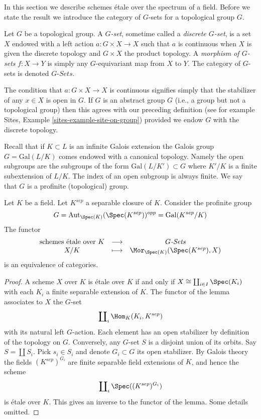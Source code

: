 \noindent
In this section we describe schemes \'etale over the spectrum of
a field. Before we state the result we introduce
the category of $G$-sets for a topological group $G$.

\begin{definition}
\label{definition-G-set-continuous}
Let $G$ be a topological group.
A {\it $G$-set}, sometime called a {\it discrete $G$-set},
is a set $X$ endowed with a left action $a : G \times X \to X$
such that $a$ is continuous when $X$ is given the discrete topology and
$G \times X$ the product topology.
A {\it morphism of $G$-sets} $f : X \to Y$ is simply any $G$-equivariant
map from $X$ to $Y$.
The category of $G$-sets is denoted {\it $G\textit{-Sets}$}.
\end{definition}

\noindent
The condition that $a : G \times X \to X$ is continuous signifies
simply that the stabilizer of any  $x \in X$ is open in $G$.
If $G$ is an abstract group $G$ (i.e., a group but not a topological group)
then this agrees with our preceding definition (see for example
Sites, Example \ref{sites-example-site-on-group})
provided we endow $G$ with the discrete topology.

\medskip\noindent
Recall that if $K \subset L$ is an infinite Galois extension the
Galois group $G = \text{Gal}(L/K)$ comes endowed with a canonical
topology. Namely the open subgroups are the subgroups of the form
$\text{Gal}(L/K') \subset G$ where $K'/K$ is a finite subextension of $L/K$.
The index of an open subgroup is always finite.
We say that $G$ is a profinite (topological) group.

\begin{lemma}
\label{lemma-sheaves-point}
Let $K$ be a field.
Let $K^{sep}$ a separable closure of $K$.
Consider the profinite group
$$
G = \text{Aut}_{\Spec(K)}(\Spec(K^{sep}))^{opp} =
\text{Gal}(K^{sep}/K)
$$
The functor
$$
\begin{matrix}
\text{schemes \'etale over }K &
\longrightarrow &
G\textit{-Sets} \\
X/K & \longmapsto &
\Mor_{\Spec(K)}(\Spec(K^{sep}), X)
\end{matrix}
$$
is an equivalence of categories.
\end{lemma}

\begin{proof}
A scheme $X$ over $K$ is \'etale over $K$ if and only if
$X \cong \coprod_{i\in I} \Spec(K_i)$ with
each $K_i$ a finite separable extension of $K$.
The functor of the lemma associates to $X$ the $G$-set
$$
\coprod\nolimits_i \Hom_K(K_i, K^{sep})
$$
with its natural left $G$-action. Each element has an open stabilizer
by definition of the topology on $G$. Conversely, any $G$-set $S$
is a disjoint union of its orbits. Say $S = \coprod S_i$. Pick $s_i \in S_i$
and denote $G_i \subset G$ its open stabilizer. By Galois theory the fields
$(K^{sep})^{G_i}$ are finite separable field extensions of $K$, and
hence the scheme
$$
\coprod\nolimits_i \Spec((K^{sep})^{G_i})
$$
is \'etale over $K$. This gives an inverse to the functor of the lemma.
Some details omitted.
\end{proof}

